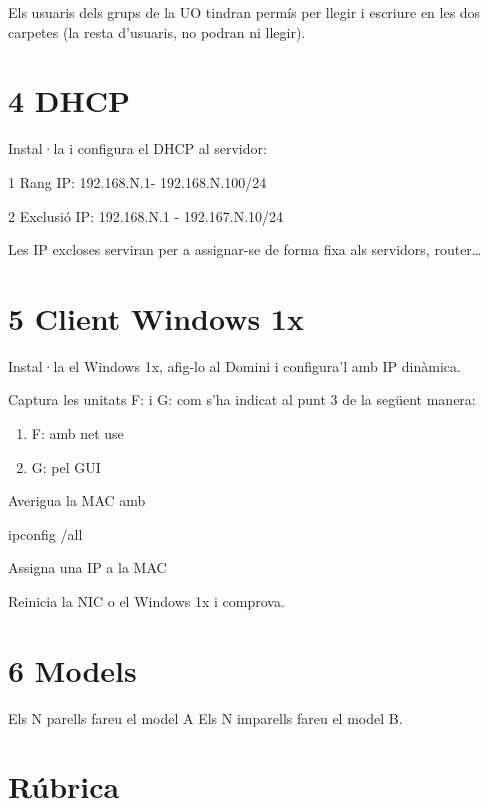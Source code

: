 \documentclass[
  a4paper,
]{article}
\newenvironment{Shaded}{\begin{snugshade}}{\end{snugshade}}
\newcommand{\AttributeTok}[1]{\textcolor[rgb]{0.13,0.29,0.53}{#1}}
\newcommand{\NormalTok}[1]{#1}
\begin{document}
Els usuaris dels grups de la UO tindran permís per llegir i escriure en
les dos carpetes (la resta d'usuaris, no podran ni llegir).

\section{4 DHCP}\label{dhcp}

Instal·la i configura el DHCP al servidor:

1 Rang IP: 192.168.N.1- 192.168.N.100/24

2 Exclusió IP: 192.168.N.1 - 192.167.N.10/24

Les IP excloses serviran per a assignar-se de forma fixa als servidors,
router\ldots{}

\section{5 Client Windows 1x}\label{client-windows-1x}

Instal·la el Windows 1x, afig-lo al Domini i configura'l amb IP
dinàmica.

Captura les unitats F: i G: com s'ha indicat al punt 3 de la següent
manera:

\begin{enumerate}
\def\labelenumi{\arabic{enumi}.}
\item
  F: amb net use
\item
  G: pel GUI
\end{enumerate}

Averigua la MAC amb

\begin{Shaded}
\begin{Highlighting}[]

\NormalTok{ipconfig }\AttributeTok{/all}
\end{Highlighting}
\end{Shaded}

Assigna una IP a la MAC

Reinicia la NIC o el Windows 1x i comprova.

\section{6 Models}\label{models}

Els N parells fareu el model A Els N imparells fareu el model B.

\section{Rúbrica}\label{ruxfabrica}
\end{document}
